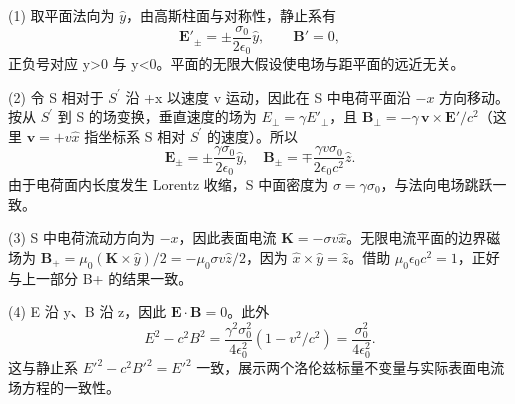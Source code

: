 (1) 取平面法向为 \(\hat y\)，由高斯柱面与对称性，静止系有
\[
\boldsymbol E'_\pm=\pm\frac{\sigma_0}{2\epsilon_0}\hat y,\qquad \boldsymbol B'=0,
\]
正负号对应 y>0 与 y<0。平面的无限大假设使电场与距平面的远近无关。

(2) 令 S 相对于 \(S^{\prime}\) 沿 +x 以速度 v 运动，因此在 S 中电荷平面沿 \(-x\) 方向移动。按从 \(S^{\prime}\) 到 S 的场变换，垂直速度的场为 \(E_\perp=\gamma E'_\perp\)，且 \(\boldsymbol B_\perp=-\gamma\,\boldsymbol v\times\boldsymbol E'/c^2\)（这里 \(\boldsymbol v=+v\hat x\) 指坐标系 S 相对 \(S^{\prime}\) 的速度）。所以
\[
\boldsymbol E_\pm=\pm\frac{\gamma\sigma_0}{2\epsilon_0}\hat y,\quad
\boldsymbol B_\pm=\mp\frac{\gamma v\sigma_0}{2\epsilon_0c^2}\hat z.
\]
由于电荷面内长度发生 Lorentz 收缩，S 中面密度为 \(\sigma=\gamma\sigma_0\)，与法向电场跳跃一致。

(3) S 中电荷流动方向为 \(-x\)，因此表面电流 \(\boldsymbol K=-\sigma v\hat x\)。无限电流平面的边界磁场为 \(\boldsymbol B_+=\mu_0(\boldsymbol K\times\hat y)/2=-\mu_0\sigma v\hat z/2\)，因为 \(\hat x\times\hat y=\hat z\)。借助 \(\mu_0\epsilon_0c^2=1\)，正好与上一部分 B+ 的结果一致。

(4) E 沿 y、B 沿 z，因此 \(\boldsymbol E\cdot\boldsymbol B=0\)。此外
\[
E^2-c^2B^2=
\frac{\gamma^2\sigma_0^2}{4\epsilon_0^2}(1-v^2/c^2)
=\frac{\sigma_0^2}{4\epsilon_0^2}.
\]
这与静止系 \(E'^2-c^2B'^2=E'^2\) 一致，展示两个洛伦兹标量不变量与实际表面电流场方程的一致性。
